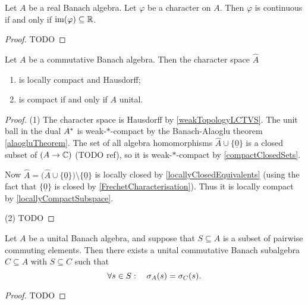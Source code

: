 \begin{lemma}
Let $A$ be a real Banach algebra. Let $\varphi$ be a character on $A$. Then $\varphi$ is continuous \textup{if and only if} $\operatorname{im}(\varphi)\subseteq \mathbb{R}$.
\end{lemma}
\begin{proof}
TODO
\end{proof}

\begin{proposition} \label{characterSpaceLocallyCompact}
Let $A$ be a commutative Banach algebra. Then the character space $\hat{A}$
\begin{enumerate}
\item is locally compact and Hausdorff;
\item is compact if and only if $A$ unital.
\end{enumerate}
\end{proposition}
\begin{proof}
(1) The character space is Hausdorff by \ref{weakTopologyLCTVS}. The unit ball in the dual ${A}^*$ is weak-$*$-compact by the Banach-Alaoglu theorem \ref{alaogluTheorem}. The set of all algebra homomorphisms $\hat{A}\cup \{\underline{0}\}$ is a closed subset of $(A\to \mathbb{C})$ (TODO ref), so it is weak-$*$-compact by \ref{compactClosedSets}.

Now $\hat{A} = \big(\hat{A}\cup \{\underline{0}\}\big)\setminus \{\underline{0}\}$ is locally closed by \ref{locallyClosedEquivalents} (using the fact that $\{\underline{0}\}$ is closed by \ref{FrechetCharacterisation}). Thus it is locally compact by \ref{locallyCompactSubspace}.

(2) TODO
\end{proof}

\begin{proposition} \label{commutativeSameSpectrum}
Let $A$ be  a  unital  Banach  algebra,  and  suppose  that $S\subseteq A$ is a subset  of  pairwise commuting elements.  Then there exists a unital commutative Banach subalgebra $C\subseteq A$ with $S\subseteq C$ such that
\[ \forall s\in S: \quad \sigma_A(s) = \sigma_C(s). \]
\end{proposition}
\begin{proof}
TODO
\end{proof}

